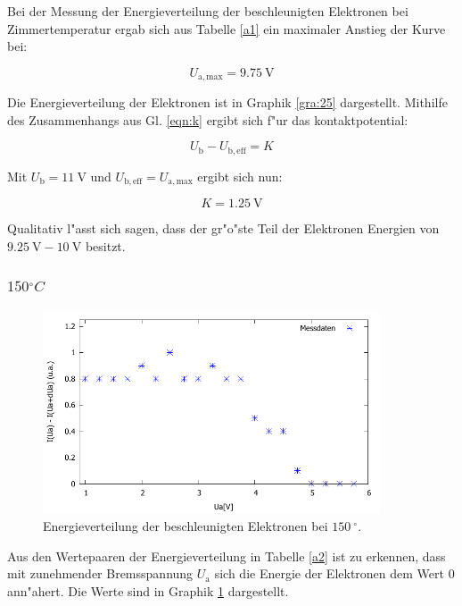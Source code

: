 Bei der Messung der Energieverteilung der beschleunigten Elektronen bei Zimmertemperatur ergab sich aus Tabelle \ref{a1} ein maximaler Anstieg der Kurve bei:

\begin{equation}
	U_\mathrm{a,max} = \SI{9.75}{\volt}
\end{equation}

Die Energieverteilung der Elektronen ist in Graphik \ref{gra:25} dargestellt.
Mithilfe des Zusammenhangs aus Gl. \eqref{eqn:k} ergibt sich f"ur das kontaktpotential:

\begin{equation}
	U_\mathrm{b} - U_\mathrm{b,eff} = K
\end{equation}

Mit $U_\mathrm{b} = \SI{11}{\volt}$ und $U_\mathrm{b,eff} = U_\mathrm{a,max}$ ergibt sich nun:

\begin{equation}
	K = \SI{1.25}{\volt}
\end{equation}

Qualitativ l"asst sich sagen, dass der gr"o"ste Teil der Elektronen Energien von $\SI{9.25}{\volt} - \SI{10}{\volt}$ besitzt.

\subsubsection{$\si{150}{^\circ C}$} %
\label{sub:_sis}



\begin{figure}[!h]
	\centering
	\includegraphics[width = 10cm]{img/t150.pdf}
	\caption{Energieverteilung der beschleunigten Elektronen bei $\SI{150}{^\circ}$.}
	\label{gra:150}
\end{figure}

Aus den Wertepaaren der Energieverteilung in Tabelle \ref{a2} ist zu erkennen, dass mit zunehmender Bremsspannung $U_\mathrm{a}$ sich die Energie der Elektronen dem Wert $0$ ann"ahert.
Die Werte sind in Graphik \ref{gra:150} dargestellt.

